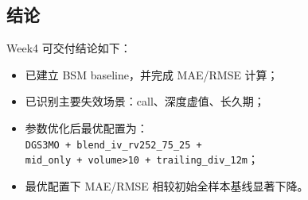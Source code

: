 \documentclass[11pt]{article}
\begin{document}
\subsection{结论}

Week4 可交付结论如下：
\begin{itemize}
  \item 已建立 BSM baseline，并完成 MAE/RMSE 计算；
  \item 已识别主要失效场景：call、深度虚值、长久期；
  \item 参数优化后最优配置为：\\
  \texttt{DGS3MO + blend\_iv\_rv252\_75\_25 +}\\
  \texttt{mid\_only + volume>10 + trailing\_div\_12m}；
  \item 最优配置下 MAE/RMSE 相较初始全样本基线显著下降。
\end{itemize}
\end{document}
